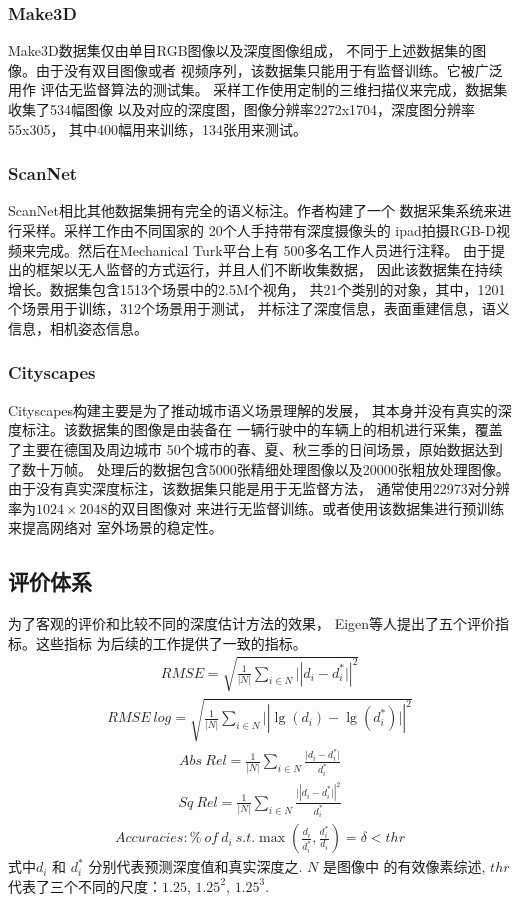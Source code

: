 \subsubsection{Make3D}
Make3D数据集仅由单目RGB图像以及深度图像组成，
不同于上述数据集的图像。由于没有双目图像或者
视频序列，该数据集只能用于有监督训练。它被广泛用作
评估无监督算法的测试集。
采样工作使用定制的三维扫描仪来完成，数据集收集了534幅图像
以及对应的深度图，图像分辨率2272x1704，深度图分辨率55x305，
其中400幅用来训练，134张用来测试。
\subsubsection{ScanNet}
ScanNet相比其他数据集拥有完全的语义标注。作者构建了一个
数据采集系统来进行采样。采样工作由不同国家的
20个人手持带有深度摄像头的
ipad拍摄RGB-D视频来完成。然后在Mechanical Turk平台上有
500多名工作人员进行注释。
由于提出的框架以无人监督的方式运行，并且人们不断收集数据，
因此该数据集在持续增长。数据集包含1513个场景中的2.5M个视角，
共21个类别的对象，其中，1201个场景用于训练，312个场景用于测试，
并标注了深度信息，表面重建信息，语义信息，相机姿态信息。
\subsubsection{Cityscapes}
Cityscapes构建主要是为了推动城市语义场景理解的发展，
其本身并没有真实的深度标注。该数据集的图像是由装备在
一辆行驶中的车辆上的相机进行采集，覆盖了主要在德国及周边城市
50个城市的春、夏、秋三季的日间场景，原始数据达到了数十万帧。
处理后的数据包含5000张精细处理图像以及20000张粗放处理图像。
由于没有真实深度标注，该数据集只能是用于无监督方法，
通常使用22973对分辨率为$1024 \times 2048$的双目图像对
来进行无监督训练。或者使用该数据集进行预训练来提高网络对
室外场景的稳定性。

\subsection{评价体系}
为了客观的评价和比较不同的深度估计方法的效果，
Eigen等人\cite{eigen2014depth}提出了五个评价指标。这些指标
为后续的工作提供了一致的指标。
\begin{align}
 RMSE=\sqrt{\frac{1}{\lvert N \rvert} \sum\nolimits_{i\in N}\lvert|d_i - d_i^*\rvert|^2} 
\end{align}
\begin{align}
  RMSE \ log = \sqrt{\frac{1}{\lvert N \rvert}\sum\nolimits_{i\in N}\lvert| \lg(d_i) - \lg(d_i^*) \rvert|^2}
\end{align}
\begin{align}
  Abs \ Rel=\frac{1}{\lvert N \rvert}\sum\nolimits_{i \in N}\frac{\lvert d_i - d_i^* \rvert}{d_i^*}
\end{align}
\begin{align}
  Sq \ Rel=\frac{1}{\lvert N \rvert}\sum\nolimits_{i \in N}\frac{\lvert| d_i - d_i^* \rvert|^2}{d_i^*}
\end{align}
\begin{align}
  Accuracies:\% \ of \ d_i \ s.t. \max(\frac{d_i}{d_i^*},\frac{d_i^*}{d_i})=\delta < thr 
\end{align}
式中$d_i$ 和 $d_i^*$ 分别代表预测深度值和真实深度之. $N$ 是图像中
的有效像素综述, $thr$ 代表了三个不同的尺度：$1.25$, $1.25^2$, $1.25^3$. 
